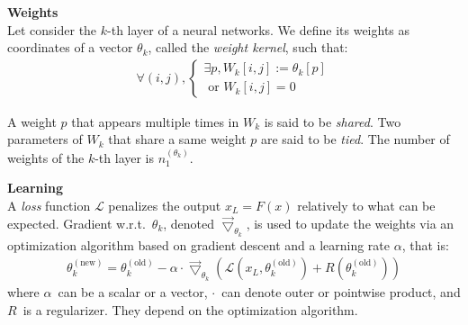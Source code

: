 \begin{definition}\textbf{Weights}\\
Let consider the $k$-th layer of a neural networks. We define its weights as coordinates of a vector $\theta_k$, called the \emph{weight kernel}, such that:
\begin{gather*}
  \forall (i,j),
    \begin{cases}
      \exists p, W_k[i,j] := \theta_k[p] \\
      \text{ or } W_k[i,j] = 0
    \end{cases}
\end{gather*}
\end{definition}
A weight $p$ that appears multiple times in $W_k$ is said to be \emph{shared}. Two parameters of $W_k$ that share a same weight $p$ are said to be \emph{tied}. The number of weights of the $k$-th layer is $n_1^{(\theta_k)}$.

\begin{remark}\textbf{Learning}\\
A \emph{loss} function $\mathcal{L}$ penalizes the output $x_L = F(x)$ relatively to what can be expected. Gradient w.r.t.~$\theta_k$, denoted $\vec{\bigtriangledown}_{\theta_k}$, is used to update the weights via an optimization algorithm based on gradient descent and a learning rate $\alpha$, that is:
\begin{gather}
\theta_k^{(\text{new})} = \theta_k^{(\text{old})} - \alpha \cdot \vec{\bigtriangledown}_{\theta_k} \left( \mathcal{L}\left( x_L, \theta_k^{(\text{old})} \right) + R\left( \theta_k^{(\text{old})} \right) \right)
\end{gather}
where $\alpha$~can be a scalar or a vector, $\cdot$~can denote outer or pointwise product, and $R$~is a regularizer. They depend on the optimization algorithm.
\end{remark}


